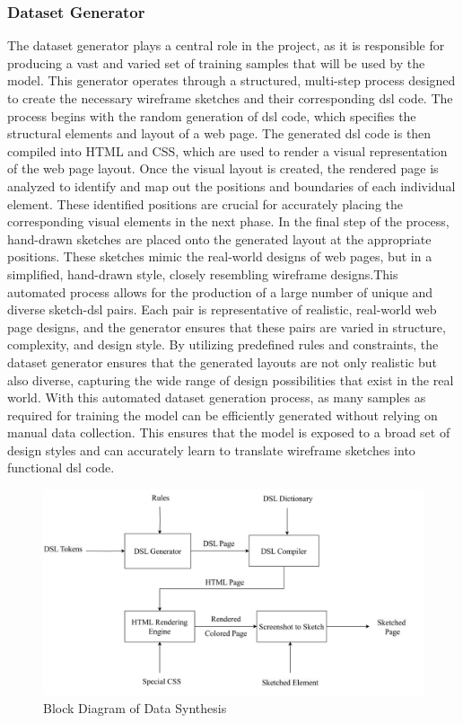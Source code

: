 \subsubsection{Dataset Generator}
The dataset generator plays a central role in the project, as it is responsible for producing a vast and varied set of training samples that will be used by the model. This generator operates through a structured, multi-step process designed to create the necessary wireframe sketches and their corresponding \gls{dsl} code. The process begins with the random generation of \gls{dsl} code, which specifies the structural elements and layout of a web page. The generated \gls{dsl} code is then compiled into HTML and CSS, which are used to render a visual representation of the web page layout. Once the visual layout is created, the rendered page is analyzed to identify and map out the positions and boundaries of each individual element. These identified positions are crucial for accurately placing the corresponding visual elements in the next phase. In the final step of the process, hand-drawn sketches are placed onto the generated layout at the appropriate positions. These sketches mimic the real-world designs of web pages, but in a simplified, hand-drawn style, closely resembling wireframe designs.This automated process allows for the production of a large number of unique and diverse sketch-\gls{dsl} pairs. Each pair is representative of realistic, real-world web page designs, and the generator ensures that these pairs are varied in structure, complexity, and design style. By utilizing predefined rules and constraints, the dataset generator ensures that the generated layouts are not only realistic but also diverse, capturing the wide range of design possibilities that exist in the real world. With this automated dataset generation process, as many samples as required for training the model can be efficiently generated without relying on manual data collection. This ensures that the model is exposed to a broad set of design styles and can accurately learn to translate wireframe sketches into functional \gls{dsl} code.

\begin{figure}[H]
    \centering
    \includegraphics[width=\textwidth]{images/Dataset Generator.png}\caption{Block Diagram of Data Synthesis}\label{fig:Synthesis}
\end{figure}



